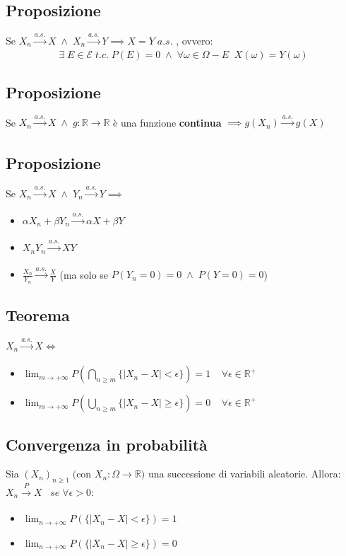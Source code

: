 \documentclass{article}
\begin{document}
\subsection*{Proposizione}
Se $X_{n} \xrightarrow[]{a.s.}X \; \wedge \; X_{n} \xrightarrow[]{a.s.}Y \implies X=Y \; a.s.$ , ovvero:
\[ \exists \; E \in \mathcal{E} \; t.c. \; P(E)=0 \; \wedge \; \forall \omega \in \Omega - E \; \; X(\omega)=Y(\omega) \]

\subsection*{Proposizione}
Se $X_{n} \xrightarrow[]{a.s.}X \; \wedge \; g: \mathbb{R}\to \mathbb{R}$ è una funzione \textbf{continua} $\implies g(X_{n}) \xrightarrow[]{a.s.}g(X)$

\subsection*{Proposizione}
Se $X_{n} \xrightarrow[]{a.s.}X \; \wedge \; Y_{n} \xrightarrow[]{a.s.}Y \implies$
\begin{itemize}
\item $\alpha X_{n}+\beta  Y_{n} \xrightarrow[]{a.s.} \alpha X+\beta Y$
\item $X_{n} Y_{n} \xrightarrow[]{a.s.}XY$
\item $\frac{X_{n}}{Y_{n}} \xrightarrow[]{a.s.}\frac{X}{Y}$ (ma solo se $P(Y_{n}=0)=0 \; \wedge \; P(Y=0)=0$)
\end{itemize}

\subsection*{Teorema}
$X_{n} \xrightarrow[]{a.s.}X \iff$
\begin{itemize}
\item $\lim_{m\to +\infty}P(\bigcap_{n\geq m}^{}\{|X_{n}-X|<\epsilon \}) = 1 \; \; \; \; \forall \epsilon \in \mathbb{R}^{+}$
\item $\lim_{m\to +\infty}P(\bigcup_{n\geq m}^{}\{|X_{n}-X| \geq \epsilon \}) = 0 \; \; \; \; \forall \epsilon \in \mathbb{R}^{+}$
\end{itemize}

\subsection*{Convergenza in probabilità}
Sia $(X_{n})_{n \geq 1} \; ($con $ X_{n}: \Omega \to \mathbb{R})$ una successione di variabili aleatorie. Allora:\\
$X_{n} \xrightarrow[]{P}X \; \; \; se \; \forall \epsilon > 0$:
\begin{itemize}
\item $\lim_{n\to +\infty}P(\{|X_{n}-X|<\epsilon \}) = 1$
\item $\lim_{n\to +\infty}P(\{|X_{n}-X|\geq \epsilon \}) = 0$
\end{itemize}
\end{document}
